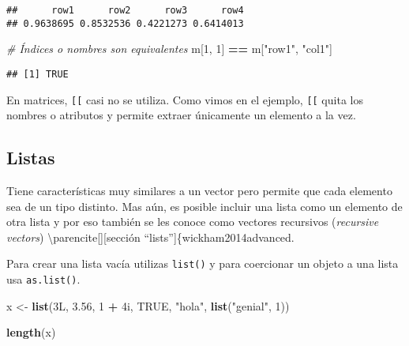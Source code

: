 \documentclass[]{article}
\newenvironment{Shaded}{\begin{snugshade}}{\end{snugshade}}
\newcommand{\KeywordTok}[1]{\textcolor[rgb]{0.13,0.29,0.53}{\textbf{#1}}}
\newcommand{\DecValTok}[1]{\textcolor[rgb]{0.00,0.00,0.81}{#1}}
\newcommand{\FloatTok}[1]{\textcolor[rgb]{0.00,0.00,0.81}{#1}}
\newcommand{\StringTok}[1]{\textcolor[rgb]{0.31,0.60,0.02}{#1}}
\newcommand{\CommentTok}[1]{\textcolor[rgb]{0.56,0.35,0.01}{\textit{#1}}}
\newcommand{\OtherTok}[1]{\textcolor[rgb]{0.56,0.35,0.01}{#1}}
\newcommand{\OperatorTok}[1]{\textcolor[rgb]{0.81,0.36,0.00}{\textbf{#1}}}
\newcommand{\NormalTok}[1]{#1}
\begin{document}
\begin{verbatim}
##      row1      row2      row3      row4 
## 0.9638695 0.8532536 0.4221273 0.6414013
\end{verbatim}

\begin{Shaded}
\begin{Highlighting}[]
\CommentTok{# Índices o nombres son equivalentes}
\NormalTok{m[}\DecValTok{1}\NormalTok{, }\DecValTok{1}\NormalTok{] }\OperatorTok{==}\StringTok{ }\NormalTok{m[}\StringTok{"row1"}\NormalTok{, }\StringTok{"col1"}\NormalTok{]}
\end{Highlighting}
\end{Shaded}

\begin{verbatim}
## [1] TRUE
\end{verbatim}

\begin{nota}
En matrices, \texttt{[[} casi no se utiliza. Como 
vimos en el ejemplo, \texttt{[[} quita los nombres o atributos y permite extraer
únicamente un elemento a la vez.
\end{nota}

\subsection{Listas}\label{listas}

Tiene características muy similares a un vector pero permite que cada
elemento sea de un tipo distinto. Mas aún, es posible incluir una lista
como un elemento de otra lista y por eso también se les conoce como
vectores recursivos (\emph{recursive vectors})
\textbackslash{}parencite{[}{]}{[}sección
``lists''{]}\{wickham2014advanced.

Para crear una lista vacía utilizas \texttt{list()} y para coercionar un
objeto a una lista usa \texttt{as.list()}.

\begin{Shaded}
\begin{Highlighting}[]
\NormalTok{x <-}\StringTok{ }\KeywordTok{list}\NormalTok{(3L, }\FloatTok{3.56}\NormalTok{, }\DecValTok{1} \OperatorTok{+}\StringTok{ }\NormalTok{4i, }\OtherTok{TRUE}\NormalTok{, }\StringTok{"hola"}\NormalTok{, }\KeywordTok{list}\NormalTok{(}\StringTok{"genial"}\NormalTok{, }\DecValTok{1}\NormalTok{))}

\KeywordTok{length}\NormalTok{(x)}
\end{Highlighting}
\end{Shaded}
\end{document}
